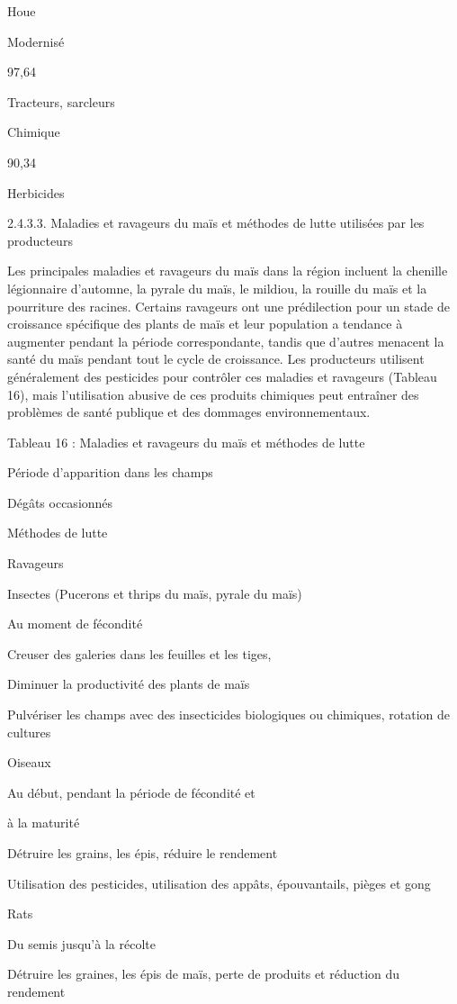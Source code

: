 \documentclass[12pt,oneside]{report}
\begin{document}
Houe

Modernisé

97,64

Tracteurs, sarcleurs

Chimique

90,34

Herbicides

2.4.3.3. Maladies et ravageurs du maïs et méthodes de lutte utilisées par les producteurs

Les principales maladies et ravageurs du maïs dans la région incluent la chenille légionnaire d'automne, la pyrale du maïs, le mildiou, la rouille du maïs et la pourriture des racines. Certains ravageurs ont une prédilection pour un stade de croissance spécifique des plants de maïs et leur population a tendance à augmenter pendant la période correspondante, tandis que d’autres menacent la santé du maïs pendant tout le cycle de croissance. Les producteurs utilisent généralement des pesticides pour contrôler ces maladies et ravageurs (Tableau 16), mais l'utilisation abusive de ces produits chimiques peut entraîner des problèmes de santé publique et des dommages environnementaux.

Tableau 16 : Maladies et ravageurs du maïs et méthodes de lutte

Période d’apparition dans les champs

Dégâts occasionnés

Méthodes de lutte

Ravageurs

Insectes (Pucerons et thrips du maïs, pyrale du maïs)

Au moment de fécondité

Creuser des galeries dans les feuilles et les tiges,

Diminuer la productivité des plants de maïs

Pulvériser les champs avec des insecticides biologiques ou chimiques, rotation de cultures

Oiseaux

Au début, pendant la période de fécondité et

à la maturité

Détruire les grains, les épis, réduire le rendement

Utilisation des pesticides, utilisation des appâts, épouvantails, pièges et gong

Rats

Du semis jusqu'à la récolte

Détruire les graines, les épis de maïs, perte de produits et réduction du rendement
\end{document}
